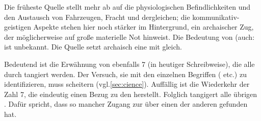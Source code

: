 \label{sec:com}




Die früheste Quelle stellt mehr ab auf die physiologischen Befindlichkeiten und den Austausch von Fahrzeugen, Fracht und dergleichen; die kommunikativ-geistigen Aspekte stehen hier noch stärker im Hintergrund, ein archaischer Zug, der möglicherweise auf große materielle Not hinweist. Die Bedeutung von  (auch:  ist unbekannt. Die Quelle setzt archaisch eine  mit  gleich.

Bedeutend ist die Erwähnung von ebenfalls 7  (in heutiger Schreibweise), die alle durch  tangiert werden.
Der Versuch, sie mit den einzelnen Begriffen ( etc.) zu identifizieren, muss scheitern (vgl.\cref{sec:cience}). Auffällig ist die Wiederkehr der Zahl 7, die eindeutig einen Bezug zu den  herstellt. Folglich tangigert  alle übrigen . Dafür spricht, dass so mancher Zugang zur  über einen der anderen  gefunden hat. 




